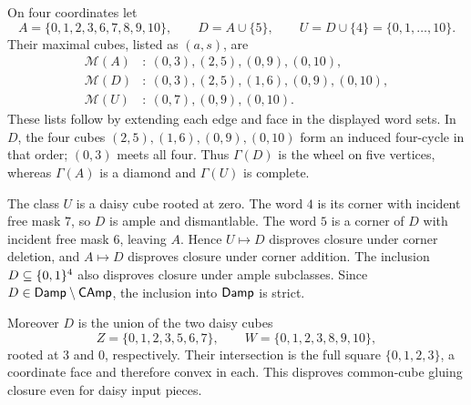 \begin{example}
\label{ex:cube-chordal-corner}
On four coordinates let
\[
 A=\{0,1,2,3,6,7,8,9,10\},\qquad D=A\cup\{5\},\qquad
 U=D\cup\{4\}=\{0,1,\ldots,10\}.
\]
Their maximal cubes, listed as $(a,s)$, are
\begin{align*}
 \mathcal M(A)&:\ (0,3),(2,5),(0,9),(0,10),\\
 \mathcal M(D)&:\ (0,3),(2,5),(1,6),(0,9),(0,10),\\
 \mathcal M(U)&:\ (0,7),(0,9),(0,10).
\end{align*}
These lists follow by extending each edge and face in the displayed
word sets. In $D$, the four cubes
$(2,5),(1,6),(0,9),(0,10)$ form an induced four-cycle in that order;
$(0,3)$ meets all four. Thus $\Gamma(D)$ is the wheel on five vertices,
whereas $\Gamma(A)$ is a diamond and $\Gamma(U)$ is complete.

The class $U$ is a daisy cube rooted at zero. The word $4$ is its corner
with incident free mask $7$, so $D$ is ample and dismantlable.
The word $5$ is a corner of $D$ with incident free mask $6$, leaving $A$.
Hence $U\mapsto D$ disproves closure under corner deletion, and
$A\mapsto D$ disproves closure under corner addition. The inclusion
$D\subseteq\{0,1\}^4$ also disproves closure under ample subclasses.
Since $D\in\mathsf{Damp}\setminus\mathsf{CAmp}$, the inclusion into $\mathsf{Damp}$
is strict.

Moreover $D$ is the union of the two daisy cubes
\[
 Z=\{0,1,2,3,5,6,7\},\qquad W=\{0,1,2,3,8,9,10\},
\]
rooted at $3$ and $0$, respectively. Their intersection is the full
square $\{0,1,2,3\}$, a coordinate face and therefore convex in each.
This disproves common-cube gluing closure even for daisy input pieces.
\end{example}


